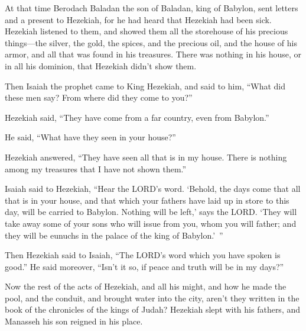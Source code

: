 \myverse{}At that time Berodach Baladan the son of Baladan, king of Babylon,
sent letters and a present to Hezekiah, for he had heard that Hezekiah had been sick.
\myverse{}Hezekiah listened to them, and showed them all the storehouse of his precious
things—the silver, the gold, the spices, and the precious oil, and the house of his armor, and all that
was found in his treasures. There was nothing in his house, or in all his dominion, that Hezekiah didn’t
show them.

\myverse{}Then Isaiah the prophet came to King Hezekiah, and said to him,
“What did these men say? From where did they come to you?”

Hezekiah said, “They have come from a far country, even from Babylon.”

\myverse{}He said, “What have they seen in your house?”

Hezekiah answered, “They have seen all that is in my house. There is nothing among my treasures
that I have not shown them.”

\myverse{}Isaiah said to Hezekiah, “Hear the LORD’s word.
\myverse{}‘Behold, the days come that all that is in your house, and that which your
fathers have laid up in store to this day, will be carried to Babylon. Nothing will be left,’ says the
LORD.
\myverse{}‘They will take away some of your sons who will issue from you, whom you
will father; and they will be eunuchs in the palace of the king of Babylon.’ ”

\myverse{}Then Hezekiah said to Isaiah, “The LORD’s word which you have
spoken is good.” He said moreover, “Isn’t it so, if peace and truth will be in my days?”

\myverse{}Now the rest of the acts of Hezekiah, and all his might, and
how he made the pool, and the conduit, and brought water into the city, aren’t they written in the book
of the chronicles of the kings of Judah?
\myverse{}Hezekiah slept with his fathers, and Manasseh his son reigned in his place.


